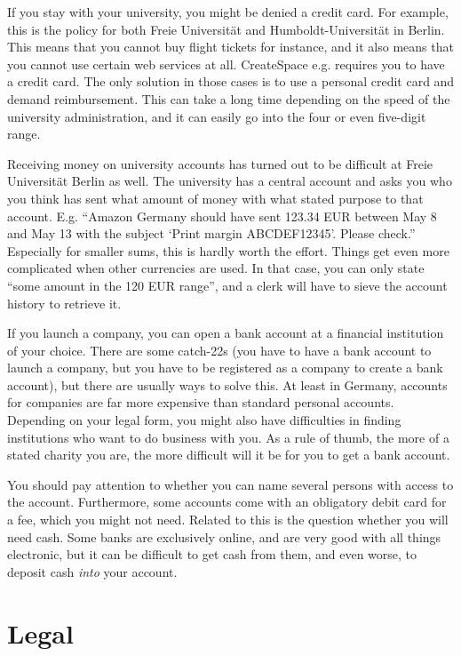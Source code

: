 \documentclass[nonflat,smallfont
]{langsci/langscibook}
\begin{document}
If you stay with your university, you might be denied a credit card. For example, this is the policy for both Freie Universität and Humboldt-Universität in Berlin. This means that you cannot buy flight tickets for instance, and it also means that you cannot use certain web services at all. CreateSpace e.g. requires you to have a credit card. The only solution in those cases is to use a personal credit card and demand reimbursement. This can take a long time depending on the speed of the university administration, and it can easily go into the four or even five-digit range. 

Receiving money on university accounts has turned out to be difficult at Freie Universität Berlin as well. The university has a central account and asks you who you think has sent what amount of money with what stated purpose to that account. E.g. ``Amazon Germany should have sent 123.34 EUR between May 8 and May 13 with the subject `Print margin ABCDEF12345'. Please check.'' Especially for smaller sums, this is hardly worth the effort. Things get even more complicated when other currencies are used. In that case, you can only state ``some amount in the 120 EUR range'', and a clerk will have to sieve the account history to retrieve it. 

If you launch a company, you can open a bank account at a financial institution of your choice. There are some catch-22s (you have to have a bank account to launch a company, but you have to be registered as a company to create a bank account), but there are usually ways to solve this. At least in Germany, accounts for companies are far more expensive than standard personal accounts. Depending on your legal form, you might also have difficulties in finding institutions who want to do business with you. As a rule of thumb, the more of a stated charity you are, the more difficult will it be for you to get a bank account. 

You should pay attention to whether you can name several persons with access to the account. Furthermore, some accounts come with an obligatory debit card for a fee, which you might not need.
Related to this is the question whether you will need cash. Some banks are exclusively online, and are very good with all things electronic, but it can be difficult to get cash from them, and even worse, to deposit cash \textit{into} your account. 


\section{Legal}\label{sec:legal}
\end{document}
